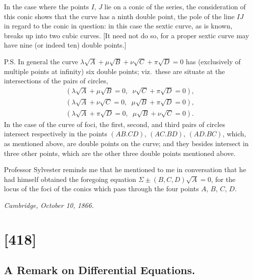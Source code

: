 \documentclass[11pt,a4paper]{article}
\begin{document}
In the case where the points $I$, $J$ lie on a conic of the series, the
consideration of this conic shows that the curve has a ninth double point, the
pole of the line $IJ$ in regard to the conic in question: in this case the
sextic curve, as is known, breaks up into two cubic curves.  [It need not do
so, for a proper sextic curve may have nine (or indeed ten) double points.]

\medskip\noindent
\textsc{P.S.}  In general the curve
$\lambda\sqrt{A} + \mu\sqrt{B} + \nu\sqrt{C} + \pi\sqrt{D} = 0$
has (exclusively of multiple points at infinity) six double points; viz.\ these
are situate at the intersections of the pairs of circles,
\begin{align*}
&(\lambda\sqrt{A} + \mu\sqrt{B} = 0,\;\; \nu\sqrt{C} + \pi\sqrt{D} = 0), \\
&(\lambda\sqrt{A} + \nu\sqrt{C} = 0,\;\; \mu\sqrt{B} + \pi\sqrt{D} = 0), \\
&(\lambda\sqrt{A} + \pi\sqrt{D} = 0,\;\; \mu\sqrt{B} + \nu\sqrt{C} = 0).
\end{align*}
In the case of the curve of foci, the first, second, and third pairs of
circles intersect respectively in the points $(AB.CD)$, $(AC.BD)$, $(AD.BC)$,
which, as mentioned above, are double points on the curve; and they besides
intersect in three other points, which are the other three double points
mentioned above.

Professor Sylvester reminds me that he mentioned to me in conversation that he
had himself obtained the foregoing equation $\Sigma\pm(B,C,D)\sqrt{A} = 0$, for
the locus of the foci of the conics which pass through the four points
$A$, $B$, $C$, $D$.

\begin{flushright}
\textit{Cambridge, October 10, 1866.}
\end{flushright}

\clearpage

\section*{[418]}
\subsection*{A Remark on Differential Equations.}
\end{document}
